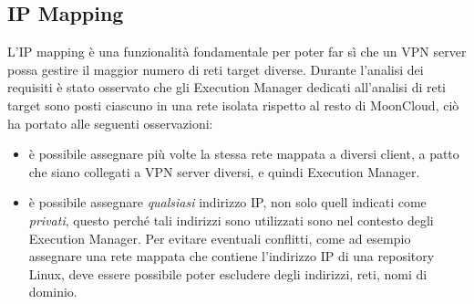 \subsection{IP Mapping}
L'IP mapping è una funzionalità fondamentale per poter far sì che un VPN server possa
gestire il maggior numero di reti target diverse.
Durante l'analisi dei requisiti è stato osservato che
gli Execution Manager dedicati all'analisi di reti target sono posti
ciascuno in una rete isolata rispetto al resto di MoonCloud, ciò ha portato
alle seguenti osservazioni:
\begin{itemize}
	\item è possibile assegnare più volte la stessa rete mappata a diversi client,
	      a patto che siano collegati a VPN server diversi, e quindi Execution Manager.
	\item è possibile assegnare \textit{qualsiasi} indirizzo IP, non solo quell
	      indicati come \textit{privati}, questo perché tali indirizzi sono utilizzati
	      sono nel contesto degli Execution Manager. Per evitare eventuali conflitti,
	      come ad esempio assegnare una rete mappata che contiene l'indirizzo IP
	      di una repository Linux, deve essere possibile poter escludere degli indirizzi,
	      reti, nomi di dominio.
\end{itemize}

